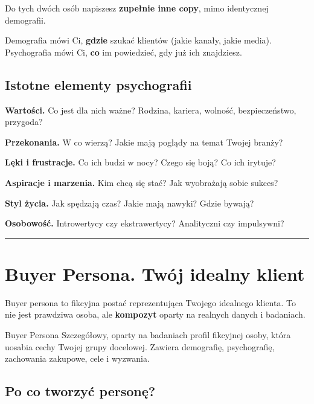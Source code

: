 \documentclass[
  12pt,
  a4paper,
  twoside,
  openright,
  12pt,
  DIV=12,
  BCOR=12mm]{scrbook}
\newcommand{\decoline}{%
  \begin{center}
    \textcolor{bordergray}{\rule{0.3\textwidth}{0.5pt}}
  \end{center}
}
\begin{document}
Do tych dwóch osób napiszesz \textbf{zupełnie inne copy}, mimo
identycznej demografii.

\begin{wskazowka}
Demografia mówi Ci, \textbf{gdzie} szukać klientów (jakie kanały, jakie media). Psychografia mówi Ci, \textbf{co} im powiedzieć, gdy już ich znajdziesz.
\end{wskazowka}

\subsection{Istotne elementy
psychografii}\label{istotne-elementy-psychografii}

\textbf{Wartości.} Co jest dla nich ważne? Rodzina, kariera, wolność,
bezpieczeństwo, przygoda?

\textbf{Przekonania.} W co wierzą? Jakie mają poglądy na temat Twojej
branży?

\textbf{Lęki i frustracje.} Co ich budzi w nocy? Czego się boją? Co ich
irytuje?

\textbf{Aspiracje i marzenia.} Kim chcą się stać? Jak wyobrażają sobie
sukces?

\textbf{Styl życia.} Jak spędzają czas? Jakie mają nawyki? Gdzie bywają?

\textbf{Osobowość.} Introwertycy czy ekstrawertycy? Analityczni czy
impulsywni?

\decoline

\section{Buyer Persona. Twój idealny
klient}\label{buyer-persona.-twuxf3j-idealny-klient}

Buyer persona to fikcyjna postać reprezentująca Twojego idealnego
klienta. To nie jest prawdziwa osoba, ale \textbf{kompozyt} oparty na
realnych danych i badaniach.

\begin{pojecie}{Buyer Persona}
Szczegółowy, oparty na badaniach profil fikcyjnej osoby, która uosabia cechy Twojej grupy docelowej. Zawiera demografię, psychografię, zachowania zakupowe, cele i wyzwania.
\end{pojecie}

\subsection{Po co tworzyć personę?}\label{po-co-tworzyux107-personux119}
\end{document}
